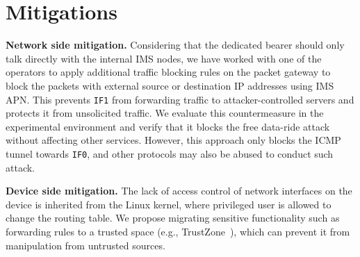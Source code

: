 \section{Mitigations}
\label{sec:background}
\textbf{Network side mitigation.} Considering that the dedicated bearer should only talk directly with the internal IMS nodes, we have worked with one of the operators to apply additional traffic blocking rules on the packet gateway to block the packets with external source or destination IP addresses using IMS APN. This prevents \texttt{IF1} from forwarding traffic to attacker-controlled servers and protects it from unsolicited traffic. We evaluate this countermeasure in the experimental environment and verify that it blocks the free data-ride attack without affecting other services. However, this approach only blocks the ICMP tunnel towards \texttt{IF0}, and other protocols may also be abused to conduct such attack. 

\textbf{Device side mitigation.} The lack of access control of network interfaces on the device is inherited from the Linux kernel, where privileged user is allowed to change the routing table. We propose migrating sensitive functionality such as forwarding rules to a trusted space (e.g., TrustZone~\cite{trustzone}), which can prevent it from manipulation from untrusted sources.
